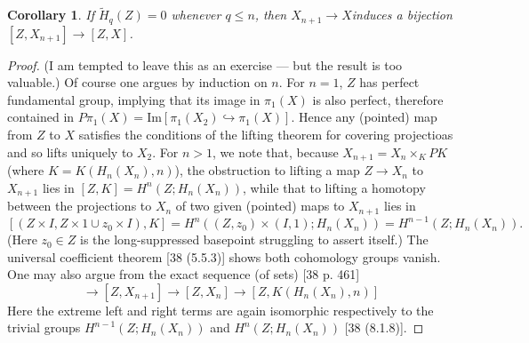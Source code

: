\documentclass[openany,leqno]{book}  %
\newcommand{\ima}{\mathrm{Im}}
\newtheorem{corollary}[theorem]{Corollary}
\begin{document}
\begin{corollary}
   If $\widetilde{H}_q(Z) = 0$ whenever $q\leqslant n$, then $X_{n+1}\longrightarrow X$induces a bijection $[Z,X_{n+1}] \longrightarrow [Z,X]$.
 \end{corollary} 
 \begin{proof}
  (I am tempted to leave this as an exercise --- but the result is too valuable.) Of course one argues by induction on $n$. For $n = 1$, $Z$ has perfect fundamental group, implying that its image in $\pi_1 (X)$ is also perfect, therefore contained in $P\pi_1 (X) = \ima[\pi_1 (X_2) \hookrightarrow \pi_1 (X)]$. Hence any (pointed) map from $Z$ to $X$ satisfies the conditions of the lifting theorem for covering projectioas and so lifts uniquely to  $X_2$. For $n > 1$, we note that, because $X_{n+1} = X_n \times_K PK$ (where $K =K(H_n(X_n), n)$), the obstruction to lifting a map $Z \longrightarrow X_n$ to $X_{n+1}$ lies in $[Z,K] = H^n(Z; H_n(X_n))$, while that to lifting a homotopy between the projections to $X_n $ of two given (pointed) maps to $X_{n+1}$ lies in
\[[(Z\times I,Z\times 1 \cup z_0\times I),K] =H^n((Z,z_0)\times (I,1); H_n(X_n)) = H^{n-1}(Z;H_n(X_n)).\]
(Here $z_0\in Z$ is the long-suppressed basepoint struggling to assert itself.) The universal coefficient theorem [38 (5.5.3)] shows both cohomology groups vanish. One may also argue from the exact sequence (of sets) [38 p. 461]
\begin{equation}
  [Z, K(H_n(X_n), n-1)]\longrightarrow[Z, X_{n+1}]\longrightarrow [Z, X_n] \longrightarrow [Z, K(H_n(X_n), n)]
\end{equation}
Here the extreme left and right terms are again isomorphic respectively to the trivial groups $H^{n-1} (Z; H_n(X_n))$ and $H^n(Z;H_n(X_n))$ [38 (8.1.8)].
 \end{proof}
 
\end{document}
